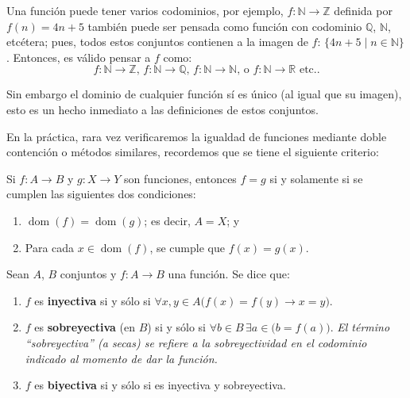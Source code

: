 \documentclass[letterpaper,DIV=14,headsepline,12pt]{scrartcl}
\providecommand\tq{\;|\;}
\DeclareMathOperator{\dom}{dom}
\begin{document}
    \begin{observacion}
        Una función puede tener varios codominios, por ejemplo, $f:\mathbb{N} \to \mathbb{Z}$ definida por $f(n)=4n+5$ también puede ser pensada como función con codominio $\mathbb{Q}$, $\mathbb{N}$, etcétera; pues, todos estos conjuntos contienen a la imagen de $f$: $\{ 4n+5 \tq n \in \mathbb{N} \}$. Entonces, es válido pensar a $f$ como:
        \[ f:\mathbb{N} \to \mathbb{Z} \text{, } f:\mathbb{N} \to \mathbb{Q} \text{, } f:\mathbb{N} \to \mathbb{N} \text{, o } f:\mathbb{N} \to \mathbb{R} \text{ etc..} \]

        Sin embargo el dominio de cualquier función sí es único (al igual que su imagen), esto es un hecho inmediato a las definiciones de estos conjuntos.
    \end{observacion}

    En la práctica, rara vez verificaremos la igualdad de funciones mediante doble contención o métodos similares, recordemos que se tiene el siguiente criterio:

    \begin{recordatorio}
        Si $f:A \to B$ y $g:X \to Y$ son funciones, entonces $f=g$ si y solamente si se cumplen las siguientes dos condiciones:
        \begin{enumerate}
            \item $\dom(f)=\dom(g)$; es decir, $A=X$; y
            \item Para cada $x \in \dom(f)$, se cumple que $f(x)=g(x)$.
        \end{enumerate}
    \end{recordatorio}

    \begin{definicion}
        Sean $A$, $B$ conjuntos y $f: A \to B$ una función. Se dice que:
        \begin{enumerate}
            \item $f$ es \textbf{inyectiva} si y sólo si $\forall x,y \in A \big( f(x)=f(y) \to x=y \big)$.
            \item $f$ es \textbf{sobreyectiva} (en $B$) si y sólo si $\forall b \in B \, \exists a \in \big( b=f(a) \big)$. \textit{El término ``sobreyectiva'' (a secas) se refiere a la sobreyectividad en el codominio indicado al momento de dar la función.}
            \item $f$ es \textbf{biyectiva} si y sólo si es inyectiva y sobreyectiva.
        \end{enumerate}
    \end{definicion}
\end{document}

